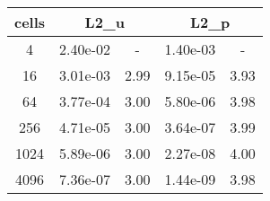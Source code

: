 \documentclass[10pt]{report}
\begin{document}
\begin{table}[H]
\begin{center}
\begin{tabular}{|c|c|c|c|c|} \hline
cells & 
\multicolumn{2}{|c|}{L2_u} & 
\multicolumn{2}{|c|}{L2_p}\\ \hline
4 & 2.40e-02 & - & 1.40e-03 & -\\ \hline
16 & 3.01e-03 & 2.99 & 9.15e-05 & 3.93\\ \hline
64 & 3.77e-04 & 3.00 & 5.80e-06 & 3.98\\ \hline
256 & 4.71e-05 & 3.00 & 3.64e-07 & 3.99\\ \hline
1024 & 5.89e-06 & 3.00 & 2.27e-08 & 4.00\\ \hline
4096 & 7.36e-07 & 3.00 & 1.44e-09 & 3.98\\ \hline
\end{tabular}
\end{center}
\end{table}
\end{document}
